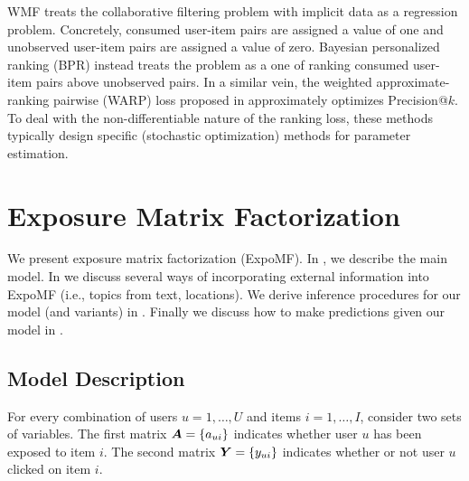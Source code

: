 WMF treats the collaborative filtering problem with implicit data as a
regression problem. Concretely, consumed user-item pairs are assigned a
value of one and unobserved user-item pairs are assigned a value of zero.
Bayesian personalized ranking (BPR) \cite{rendle2009bpr,
rendle2014improving} instead treats the problem as a one of ranking
consumed user-item pairs above unobserved pairs.
In a similar vein, the weighted approximate-ranking pairwise (WARP) loss
proposed in \citet{weston2011wsabie} approximately optimizes Precision@$k$. 
To deal with the non-differentiable nature of the ranking
loss, these methods typically design specific (stochastic optimization)
methods for parameter estimation.



\section{Exposure Matrix Factorization}\label{sec:model}

We present exposure matrix factorization (ExpoMF). 
In , we describe the main model. 
In  we discuss several ways 
of incorporating external information into ExpoMF (i.e., topics from text, locations). 
We derive inference procedures for our model (and variants) in . Finally we discuss how to make predictions given our model in .

\vfill\eject
\subsection{Model Description}
\label{sec:model_description}

For every combination of users $u=1,\dots,U$ and items $i=1,\dots,I$, consider two sets of variables. The first matrix $\boldsymbol{A} = \left\{ a_{ui} \right\}$ indicates whether user $u$ has been exposed to item $i$. The second matrix $\boldsymbol{Y} = \left\{ y_{ui} \right\}$ indicates whether or not user $u$ clicked on item $i$.

